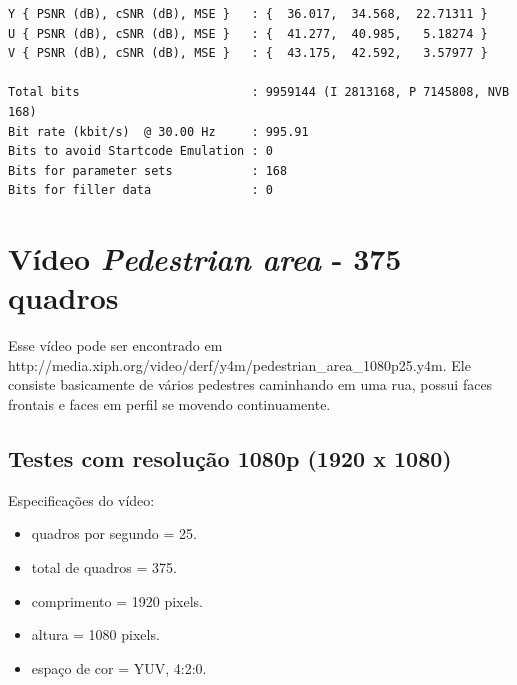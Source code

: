 \begin{lstlisting}
Y { PSNR (dB), cSNR (dB), MSE }   : {  36.017,  34.568,  22.71311 }
U { PSNR (dB), cSNR (dB), MSE }   : {  41.277,  40.985,   5.18274 }
V { PSNR (dB), cSNR (dB), MSE }   : {  43.175,  42.592,   3.57977 }

Total bits                        : 9959144 (I 2813168, P 7145808, NVB 168) 
Bit rate (kbit/s)  @ 30.00 Hz     : 995.91
Bits to avoid Startcode Emulation : 0 
Bits for parameter sets           : 168 
Bits for filler data              : 0
\end{lstlisting}


\section{ Vídeo \textit{Pedestrian area} - 375 quadros }


Esse vídeo pode ser encontrado em http://media.xiph.org/video/derf/y4m/pedestrian\_area\_1080p25.y4m. Ele consiste basicamente de vários pedestres caminhando em uma rua, possui faces frontais e faces em perfil se movendo continuamente. 


\subsection{ Testes com resolução 1080p (1920 x 1080) }

Especificações do vídeo:

\begin{itemize}
        \item quadros por segundo = 25.
        \item total de quadros    = 375.
        \item comprimento         = 1920 pixels.
        \item altura              = 1080 pixels.
        \item espaço de cor       = YUV, 4:2:0.
\end{itemize}


